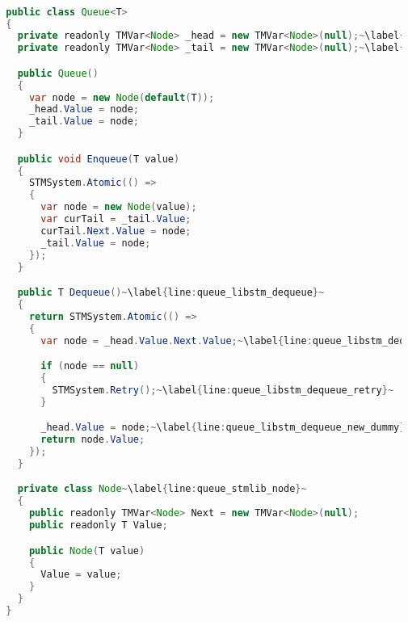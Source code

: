 \begin{lstlisting}[label=lst:impl_queue_lib,
  caption={STM Library Based Concurrent Queue Implementation},
  language=Java,  
  showspaces=false,
  showtabs=false,
  breaklines=true,
  showstringspaces=false,
  breakatwhitespace=true,
  commentstyle=\color{greencomments},
  keywordstyle=\color{bluekeywords},
  stringstyle=\color{redstrings},
  escapechar=~,
  morekeywords={atomic, retry, orelse, var, get, set, ref, out, readonly, virtual, override, region, endregion, foreach, lock}]  % Start your code-block

  public class Queue<T>
  {
    private readonly TMVar<Node> _head = new TMVar<Node>(null);~\label{line:queue_libstm_head}~
    private readonly TMVar<Node> _tail = new TMVar<Node>(null);~\label{line:queue_libstm_tail}~

    public Queue()
    {
      var node = new Node(default(T));
      _head.Value = node;
      _tail.Value = node;
    }

    public void Enqueue(T value)
    {
      STMSystem.Atomic(() =>
      {
        var node = new Node(value);
        var curTail = _tail.Value;
        curTail.Next.Value = node;
        _tail.Value = node;
      });
    }

    public T Dequeue()~\label{line:queue_libstm_dequeue}~
    {
      return STMSystem.Atomic(() =>
      {
        var node = _head.Value.Next.Value;~\label{line:queue_libstm_dequeue_skip}~ 

        if (node == null)
        {
          STMSystem.Retry();~\label{line:queue_libstm_dequeue_retry}~
        }

        _head.Value = node;~\label{line:queue_libstm_dequeue_new_dummy}~
        return node.Value;
      });
    }

    private class Node~\label{line:queue_stmlib_node}~
    {
      public readonly TMVar<Node> Next = new TMVar<Node>(null);
      public readonly T Value;

      public Node(T value)
      {
        Value = value;
      }
    }
  }

\end{lstlisting}
